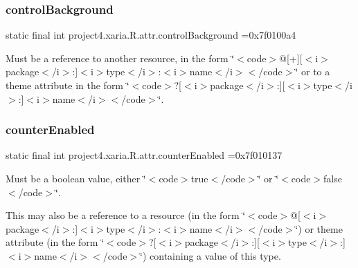 \subsubsection{\texorpdfstring{control\+Background}{controlBackground}}
{\footnotesize\ttfamily static final int project4.\+xaria.\+R.\+attr.\+control\+Background =0x7f0100a4\hspace{0.3cm}{\ttfamily [static]}}

Must be a reference to another resource, in the form \char`\"{}$<$code$>$@\mbox{[}+\mbox{]}\mbox{[}$<$i$>$package$<$/i$>$\+:\mbox{]}$<$i$>$type$<$/i$>$\+:$<$i$>$name$<$/i$>$$<$/code$>$\char`\"{} or to a theme attribute in the form \char`\"{}$<$code$>$?\mbox{[}$<$i$>$package$<$/i$>$\+:\mbox{]}\mbox{[}$<$i$>$type$<$/i$>$\+:\mbox{]}$<$i$>$name$<$/i$>$$<$/code$>$\char`\"{}. \mbox{\label{classproject4_1_1xaria_1_1R_1_1attr_a33777063f9c08b789610e6cd15413c09}} 
\subsubsection{\texorpdfstring{counter\+Enabled}{counterEnabled}}
{\footnotesize\ttfamily static final int project4.\+xaria.\+R.\+attr.\+counter\+Enabled =0x7f010137\hspace{0.3cm}{\ttfamily [static]}}

Must be a boolean value, either \char`\"{}$<$code$>$true$<$/code$>$\char`\"{} or \char`\"{}$<$code$>$false$<$/code$>$\char`\"{}. 

This may also be a reference to a resource (in the form \char`\"{}$<$code$>$@\mbox{[}$<$i$>$package$<$/i$>$\+:\mbox{]}$<$i$>$type$<$/i$>$\+:$<$i$>$name$<$/i$>$$<$/code$>$\char`\"{}) or theme attribute (in the form \char`\"{}$<$code$>$?\mbox{[}$<$i$>$package$<$/i$>$\+:\mbox{]}\mbox{[}$<$i$>$type$<$/i$>$\+:\mbox{]}$<$i$>$name$<$/i$>$$<$/code$>$\char`\"{}) containing a value of this type. \mbox{\label{classproject4_1_1xaria_1_1R_1_1attr_acbad04a94c95d17047c4539e196c9457}} 
